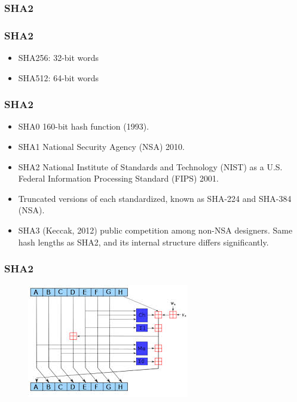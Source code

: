 \documentclass{beamer}
\begin{document}
\subsubsection{SHA2}

\begin{frame}
\frametitle{SHA2}
\begin{itemize}
\item SHA256: 32-bit words
\item SHA512: 64-bit words
\end{itemize}
\end{frame}

\begin{frame}
\frametitle{SHA2}
\begin{itemize}
\item SHA0 160-bit hash function (1993).
\item SHA1 National Security Agency (NSA) 2010.
\item SHA2 National Institute of Standards and Technology (NIST) as a U.S. Federal Information Processing Standard (FIPS) 2001.
\item Truncated versions of each standardized, known as SHA-224 and SHA-384 (NSA).
\item SHA3 (Keccak, 2012) public competition among non-NSA designers. Same hash lengths as SHA2, and its internal structure differs significantly.
\end{itemize}
\end{frame}

\begin{frame}
\frametitle{SHA2}
\begin{figure}
\includegraphics[width=0.8\linewidth]{sha.jpg}
\end{figure}
\end{frame}
\end{document}
